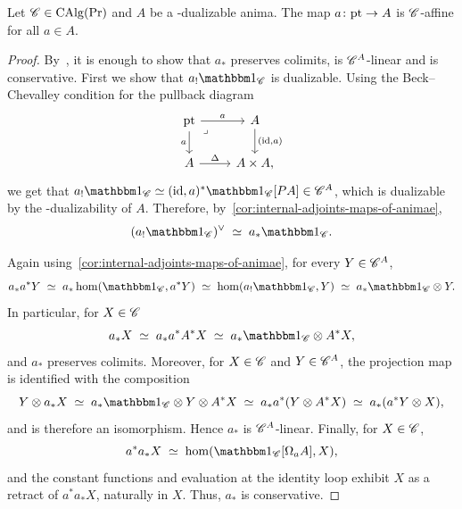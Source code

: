 \documentclass[english,svgnames,table]{article}
\begin{document}
    \begin{lemma}
    \label{lem:a*-is-affine}
        Let $\mathscr{C} \in \operatorname{CAlg}(\operatorname{Pr})$ and $A$ be a \CO-dualizable anima. The map $a \colon \mathrm{pt} \to A$ is $\mathscr{C}$-affine for all $a \in A$.
    \end{lemma}
    \begin{proof}
        By~\cite[Proposition~2.5]{BCSY-Fourier}, it is enough to show that $a_*$ preserves colimits, is $\mathscr{C}^A$-linear and is conservative.
        First we show that $a_! \ounit_{\cC}$ is dualizable.
        Using the Beck--Chevalley condition for the pullback diagram
        \begin{equation*}
            \begin{tikzcd}
                \pt & A \\
                A & {A\times A,}
                \arrow["a", from=1-1, to=1-2]
                \arrow["a"', from=1-1, to=2-1]
                \arrow["\lrcorner"{anchor=center, pos=0.125}, draw=none, from=1-1, to=2-2]
                \arrow["{(\id, a)}", from=1-2, to=2-2]
                \arrow["\Delta", from=2-1, to=2-2]
            \end{tikzcd}
        \end{equation*}
        we get that $a_! \ounit_{\cC} \simeq (\id,a)^* \ounit_{\cC}[\Path A] \in \cC^A$, which is dualizable by the \CO-dualizability of $A$. Therefore, by~\cref{cor:internal-adjoints-maps-of-animae},
        \begin{equation*}
            (a_! \ounit_{\cC})\dual \;\simeq\; a_* \ounit_{\cC}.
        \end{equation*}
        
        Again using~\cref{cor:internal-adjoints-maps-of-animae}, for every $Y \in \mathscr{C}^A$,
        \begin{equation*}
            a_* a^* Y \;\simeq\; a_*\hom(\ounit_{\cC}, a^*Y) \;\simeq\; \hom(a_!\ounit_{\cC}, Y) \;\simeq\; a_*\ounit_{\cC} \otimes Y.
        \end{equation*}
        In particular, for $X \in \mathscr{C}$
        \begin{equation*}
            a_* X \;\simeq\; a_* a^* A^* X \;\simeq\; a_* \ounit_{\cC} \otimes A^* X,
        \end{equation*}
        and $a_*$ preserves colimits.
        Moreover, for $X \in \mathscr{C}$ and $Y \in \mathscr{C}^A$, the projection map is identified with the composition
        \begin{equation*}
            Y \otimes a_*X \;\simeq\; a_*\ounit_{\cC} \otimes Y \otimes A^* X \;\simeq\; a_*a^*(Y \otimes A^*X) \;\simeq\; a_*(a^*Y \otimes X),
        \end{equation*}
        and is therefore an isomorphism. Hence $a_*$ is $\mathscr{C}^A$-linear. Finally, for $X \in \mathscr{C}$,
        \begin{equation*}
            a^* a_*X \;\simeq\; \hom(\ounit_{\cC}[\Omega_aA],X),
        \end{equation*}
        and the constant functions and evaluation at the identity loop exhibit $X$ as a retract of $a^*a_*X$, naturally in $X$. Thus, $a_*$ is conservative.
    \end{proof}
\end{document}
